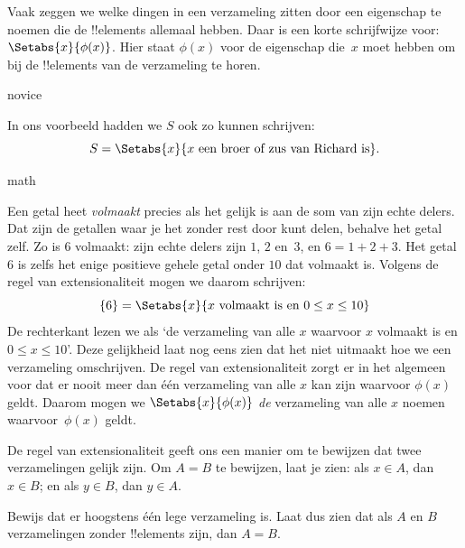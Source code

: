 \documentclass[../../../include/open-logic-section]{subfiles}
\begin{document}
Vaak zeggen we welke dingen in een verzameling zitten door een
eigenschap te noemen die de !!{element}s allemaal hebben. Daar is een korte
schrijfwijze voor: $\Setabs{x}{\phi(x)}$. Hier staat $\phi(x)$ voor
de eigenschap die~$x$ moet hebben om bij de !!{element}s van de
verzameling te horen.

\begin{tagblock}{novice}
\begin{ex}
In ons voorbeeld hadden we $S$ ook zo kunnen schrijven:
\[
S = \Setabs{x}{x \text{ een broer of zus van Richard is}}.
\]
\end{ex}
\end{tagblock}

\begin{tagblock}{math}
\begin{ex}
Een getal heet \emph{volmaakt} precies als het gelijk is aan de som
van zijn echte delers. Dat zijn de getallen waar je het zonder rest door
kunt delen, behalve het getal zelf. Zo is $6$ volmaakt: zijn echte
delers zijn $1$, $2$ en~$3$, en $6 = 1 + 2 + 3$. Het getal $6$ is
zelfs het enige positieve gehele getal onder $10$ dat volmaakt is.
Volgens de regel van extensionaliteit mogen we daarom schrijven:
\[
	\{6\} = \Setabs{x}{x\text{ volmaakt is en }0 \leq x \leq 10}
\]
De rechterkant lezen we als ‘de verzameling van alle $x$ waarvoor $x$
volmaakt is en $0 \leq x \leq 10$’. Deze gelijkheid laat nog eens zien
dat het niet uitmaakt hoe we een verzameling omschrijven. De regel van
extensionaliteit zorgt er in het algemeen voor dat er nooit meer dan één
verzameling van alle $x$ kan zijn waarvoor $\phi(x)$ geldt. Daarom
mogen we $\Setabs{x}{\phi(x)}$ \emph{de} verzameling van alle $x$
noemen waarvoor~$\phi(x)$ geldt.
\end{ex}
\end{tagblock}

De regel van extensionaliteit geeft ons een manier om te bewijzen dat
twee verzamelingen gelijk zijn. Om $A = B$ te bewijzen, laat je zien:
als $x \in A$, dan $x \in B$; en als $y \in B$, dan $y \in A$.

\begin{prob}
Bewijs dat er hoogstens één lege verzameling is. Laat dus zien dat als
$A$ en $B$ verzamelingen zonder !!{element}s zijn, dan $A = B$.
\end{prob}
\end{document}
